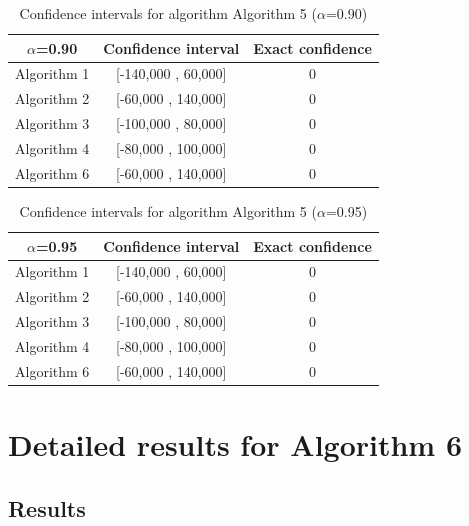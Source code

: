 \documentclass[a4paper,10pt]{article}
\begin{document}
\begin{table}[!htp]
\centering\small
\begin{tabular}{
|c|c|c|}
\hline
 $\alpha$=0.90 & Confidence interval & Exact confidence \\ \hline 
Algorithm 1 & [-140,000 , 60,000] & 0\\ \hline 
Algorithm 2 & [-60,000 , 140,000] & 0\\ \hline 
Algorithm 3 & [-100,000 , 80,000] & 0\\ \hline 
Algorithm 4 & [-80,000 , 100,000] & 0\\ \hline 
Algorithm 6 & [-60,000 , 140,000] & 0\\ \hline 

\end{tabular}
\caption{Confidence intervals for algorithm Algorithm 5 ($\alpha$=0.90)}
\end{table}
\begin{table}[!htp]
\centering\small
\begin{tabular}{
|c|c|c|}
\hline
 $\alpha$=0.95 & Confidence interval & Exact confidence \\ \hline 
Algorithm 1 & [-140,000 , 60,000] & 0\\ \hline 
Algorithm 2 & [-60,000 , 140,000] & 0\\ \hline 
Algorithm 3 & [-100,000 , 80,000] & 0\\ \hline 
Algorithm 4 & [-80,000 , 100,000] & 0\\ \hline 
Algorithm 6 & [-60,000 , 140,000] & 0\\ \hline 

\end{tabular}
\caption{Confidence intervals for algorithm Algorithm 5 ($\alpha$=0.95)}
\end{table}

 \clearpage 


\section{Detailed results for Algorithm 6}


\subsection{Results}
\end{document}
